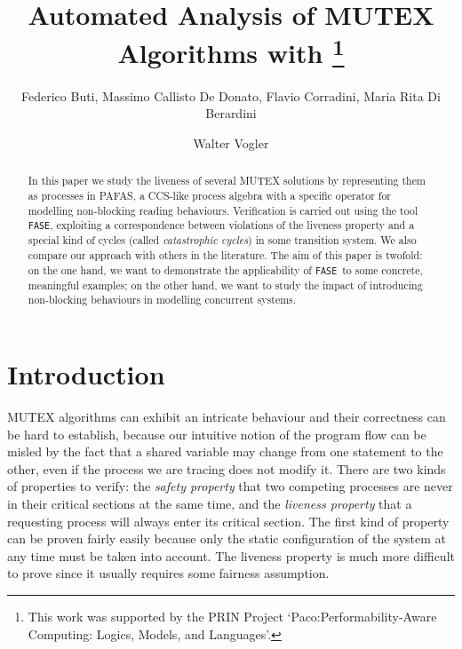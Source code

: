 \documentclass[copyright,creativecommons]{eptcs}
\title{Automated Analysis of MUTEX Algorithms with 
\thanks{
This work was supported by the PRIN Project `Paco:Performability-Aware
Computing: Logics, Models, and Languages'.}}
\author{Federico Buti, Massimo Callisto De Donato, Flavio Corradini, Maria Rita Di Berardini
\institute{School of Science and Technology, University of Camerino}
\email{\{federico.buti, massimo.callisto, flavio.corradini,
mariarita.diberardini\}@unicam.it}
\and
Walter Vogler
\institute{Institut f\"ur Informatik, Universit\"at Augsburg}
\email{vogler@informatik.uni-Augsburg.de}}
\newcommand{\fase}{\texttt{FASE}}
\begin{document}
\maketitle
 
\begin{abstract}
In this paper we study the liveness of several MUTEX solutions by
representing them as processes in PAFAS, a CCS-like process algebra
with a specific operator for modelling non-blocking reading behaviours.
Verification is carried out using the tool \fase, exploiting a
correspondence between violations of the liveness property and a special
kind of cycles (called {\em catastrophic cycles}) in some transition
system. We also compare our approach with others in the literature. The aim
of this paper is twofold: on the one hand, we want to demonstrate the
applicability of \fase\  to some concrete, meaningful examples; on the
other hand, we want to study the impact of introducing non-blocking
behaviours in modelling concurrent systems.
\end{abstract}


\section{Introduction}
MUTEX algorithms can exhibit an intricate behaviour and their correctness
can be hard to establish, because our intuitive notion of the program flow
can be misled by the fact that a shared variable may change from one
statement to the other, even if the process we are tracing does not modify
it. There are two kinds of properties to verify: the {\em safety property}
that two competing processes are never in their critical sections at the
same time, and the {\em liveness property} that a requesting process will
always enter its critical section. The first kind of property can be proven
fairly easily because only the static configuration of the system at any
time must be taken into account. The liveness property is much more
difficult to prove since it usually requires some fairness assumption.
\end{document}
